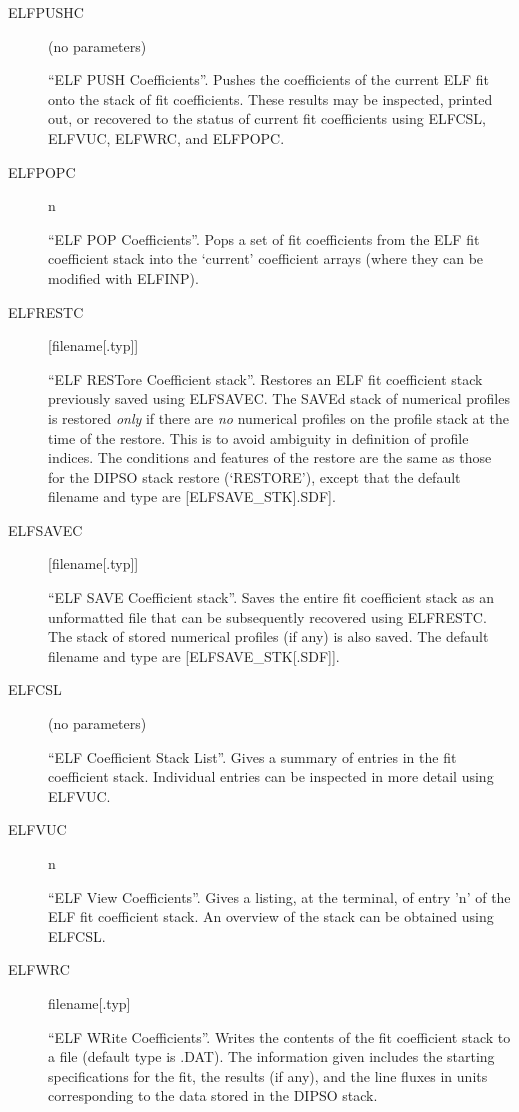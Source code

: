 \begin {description}
\item [ELFPUSHC] (no parameters)

``ELF PUSH Coefficients''. Pushes the coefficients of the current ELF
fit onto the stack of fit coefficients. These results may be
inspected, printed out, or recovered to the status of current fit
coefficients using ELFCSL, ELFVUC, ELFWRC, and ELFPOPC.

\item [ELFPOPC] n

``ELF POP Coefficients''. Pops a set of fit coefficients from the ELF
fit coefficient stack into the `current' coefficient arrays (where
they can be modified with ELFINP).

\item [ELFRESTC] [filename[.typ]]

``ELF RESTore Coefficient stack''. Restores an ELF fit coefficient
stack previously saved using ELFSAVEC. The SAVEd stack of numerical
profiles is restored {\em only} if there are {\em no} numerical
profiles on the profile stack at the time of the restore. This is to
avoid ambiguity in definition of profile indices. The conditions and
features of the restore are the same as those for the DIPSO stack
restore (`RESTORE'), except that the default filename and type are
[ELFSAVE\_STK].SDF].

\item [ELFSAVEC] [filename[.typ]]

``ELF SAVE Coefficient stack''. Saves the entire fit coefficient stack
as an unformatted file that can be subsequently recovered using
ELFRESTC. The stack of stored numerical profiles (if any) is also
saved. The default filename and type are [ELFSAVE\_STK[.SDF]].

\item [ELFCSL] (no parameters)

``ELF Coefficient Stack List''. Gives a summary of entries in the fit
coefficient stack. Individual entries can be inspected in more detail
using ELFVUC.

\item [ELFVUC] n

``ELF View Coefficients''. Gives a listing, at the terminal, of entry
'n' of the ELF fit coefficient stack. An overview of the stack can be
obtained using ELFCSL.

\item [ELFWRC] filename[.typ]

``ELF WRite Coefficients''. Writes the contents of the fit coefficient
stack to a file (default type is .DAT). The information given includes
the starting specifications for the fit, the results (if any), and the
line fluxes in units corresponding to the data stored in the DIPSO
stack.


\end{description}
